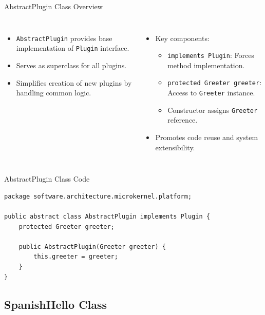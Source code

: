 \documentclass[aspectratio=169, table]{beamer}
\begin{document}
\begin{frame}{AbstractPlugin Class Overview}
\vspace{20pt}
\begin{columns}[t]
\begin{itemize}
	\item \texttt{AbstractPlugin} provides base implementation of \texttt{Plugin} interface.
	\item Serves as superclass for all plugins.
	\item Simplifies creation of new plugins by handling common logic.
\end{itemize}
\begin{itemize}
	\item Key components:
	\begin{itemize}
		\item \texttt{implements Plugin}: Forces method implementation.
		\item \texttt{protected Greeter greeter}: Access to \texttt{Greeter} instance.
		\item Constructor assigns \texttt{Greeter} reference.
	\end{itemize}
	\item Promotes code reuse and system extensibility.
\end{itemize}
\end{columns}
\end{frame}

\begin{frame}[fragile]{AbstractPlugin Class Code}
\vspace{20pt}
\begin{lstlisting}[style=JavaStyle]
package software.architecture.microkernel.platform;

public abstract class AbstractPlugin implements Plugin {
	protected Greeter greeter;
	
	public AbstractPlugin(Greeter greeter) {
		this.greeter = greeter;
	}
}
\end{lstlisting}
\end{frame}

\subsection{SpanishHello Class}
\end{document}
